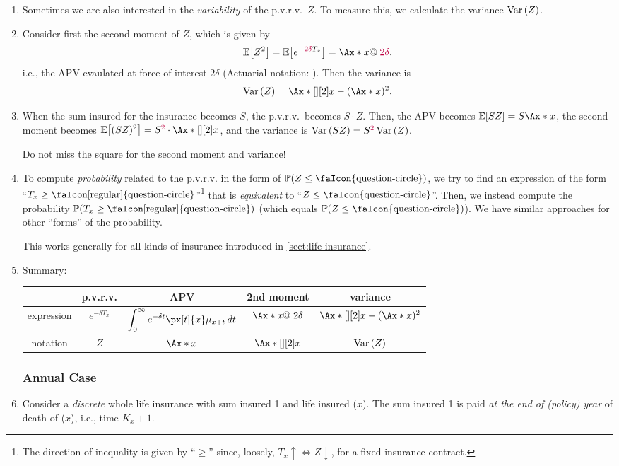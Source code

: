 \begin{enumerate}
\item Sometimes we are also interested in the \emph{variability} of the
p.v.r.v.\ \(Z\). To measure this, we calculate the variance \(\operatorname{Var}\qty(Z)\).
\item Consider first the second moment of \(Z\), which is given by
\[
\expv{Z^2}=\expv{e^{-{\color{purple} 2\delta} T_x}}=\Ax*{x}@\;{\color{purple} 2\delta},
\]
i.e., the APV evaulated at force of interest \(2\delta\) (Actuarial notation:
). Then the variance is
\[
\vari{Z}=\Ax*[][2]{x}-(\Ax*{x})^2.
\]
\item When the sum insured for the insurance becomes \( S\), the p.v.r.v.\
becomes \(S\cdot Z\). Then, the APV becomes \(\expv{SZ}=S\Ax*{x}\), the second
moment becomes \(\expv{(SZ)^2}=S^{\color{purple}2}\cdot\Ax*[][2]{x}\), and the
variance is \(\operatorname{Var}\qty(SZ)=S^{\color{purple}2}\operatorname{Var}\qty(Z)\).
\begin{warning}
Do not miss the square for the second moment and variance!
\end{warning}
\item To compute \emph{probability} related to the p.v.r.v. in the form
of \(\prob{Z\le \text{\faIcon{question-circle}}}\), we try to find an
expression of the form
``\(T_x\ge\text{\faIcon[regular]{question-circle}}\)''\footnote{The direction
of inequality is given by ``\(\ge\)'' since, loosely, \(T_x\uparrow\iff
Z\downarrow\), for a fixed insurance contract.}  that is \emph{equivalent} to
``\(Z\le \text{\faIcon{question-circle}}\)''. Then, we instead compute the
probability \(\prob{T_x\ge\text{\faIcon[regular]{question-circle}}}\) (which
equals \(\prob{Z\le \text{\faIcon{question-circle}}}\)). We have similar
approaches for other ``forms'' of the probability.
\begin{note}
This works generally for all kinds of insurance introduced in
\cref{sect:life-insurance}.
\end{note}
\item
\label{it:cts-whole-life-fmlas}
 Summary:

\begin{tabular}{ccccc}
\toprule
&p.v.r.v.&APV&2nd moment&variance\\
\midrule
expression&\(e^{-\delta T_x}\)&\(\displaystyle\int_{0}^{\infty}e^{-\delta t}\px[t]{x}\mu_{x+t}\,dt\)
&\(\Ax*{x}@\;2\delta\)&\(\Ax*[][2]{x}-(\Ax*{x})^2\)\\
notation&\(Z\)&\(\Ax*{x}\)&\(\Ax*[][2]{x}\)&\(\operatorname{Var}\qty(Z)\)\\
\bottomrule
\end{tabular}
\subsubsection*{Annual Case}
\item Consider a \emph{discrete} whole life insurance with sum insured
\faIcon{money-bill-wave} 1 and life insured (\(x\)). The sum insured 1 is
paid \emph{at the end of (policy) year} of death of (\(x\)), i.e., time
\(K_x+1\).


\end{enumerate}
